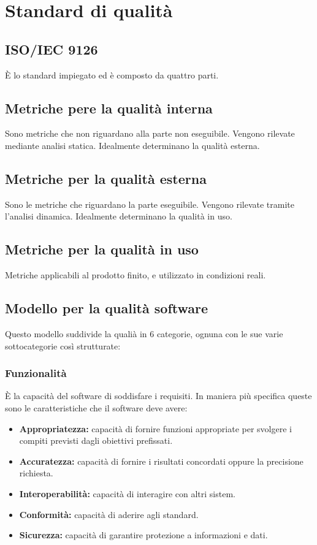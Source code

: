 \section{Standard di qualit\`a}
\subsection{ISO/IEC 9126}
\`E lo standard impiegato ed \`e composto da quattro parti.
\subsection{Metriche pere la qualit\`a interna}
Sono metriche che non riguardano alla parte non eseguibile. Vengono rilevate mediante analisi statica. Idealmente determinano la qualit\`a esterna.
\subsection{Metriche per la qualit\`a esterna}
Sono le metriche che riguardano la parte eseguibile. Vengono rilevate tramite l'analisi dinamica. Idealmente determinano la qualit\`a in uso.
\subsection{Metriche per la qualit\`a in uso}
Metriche applicabili al prodotto finito, e utilizzato in condizioni reali.
\subsection{Modello per la qualit\`a software}
Questo modello suddivide la quali\`a in 6 categorie, ognuna con le sue varie sottocategorie cos\`i strutturate:
\subsubsection{Funzionalit\`a}
\`E la capacit\`a del software di soddisfare i requisiti. In maniera pi\`u specifica queste sono le caratteristiche che il software deve avere:
\begin{itemize}
    \item \textbf{Appropriatezza:} capacit\`a di fornire funzioni appropriate per svolgere i compiti previsti dagli obiettivi prefissati.
    \item \textbf{Accuratezza:} capacit\`a di fornire i risultati concordati oppure la precisione richiesta.
    \item \textbf{Interoperabilit\`a:} capacit\`a  di interagire con altri sistem.
    \item \textbf{Conformit\`a:} capacit\`a di aderire agli standard.
    \item \textbf{Sicurezza:} capacit\`a di garantire protezione a informazioni e dati.
\end{itemize}
